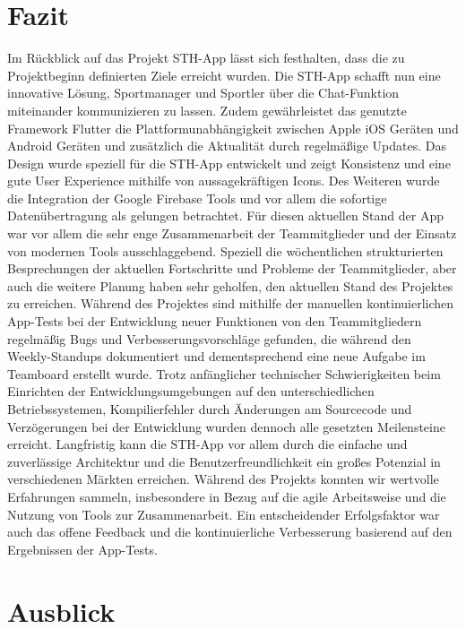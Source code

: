 \chapter{Fazit}
Im Rückblick auf das Projekt STH-App lässt sich festhalten, dass die zu Projektbeginn definierten Ziele erreicht wurden.
Die STH-App schafft nun eine innovative Lösung, Sportmanager und Sportler über die Chat-Funktion miteinander kommunizieren zu lassen.
Zudem gewährleistet das genutzte Framework Flutter die Plattformunabhängigkeit zwischen Apple iOS Geräten und Android Geräten und zusätzlich die Aktualität durch regelmäßige Updates.
Das Design wurde speziell für die STH-App entwickelt und zeigt Konsistenz und eine gute User Experience mithilfe von aussagekräftigen Icons.
Des Weiteren wurde die Integration der Google Firebase Tools und vor allem die sofortige Datenübertragung als gelungen betrachtet.\newline
Für diesen aktuellen Stand der App war vor allem die sehr enge Zusammenarbeit der Teammitglieder und der Einsatz von modernen Tools ausschlaggebend.
Speziell die wöchentlichen strukturierten Besprechungen der aktuellen Fortschritte und Probleme der Teammitglieder, aber auch die weitere Planung haben sehr geholfen, den aktuellen Stand des Projektes zu erreichen.
Während des Projektes sind mithilfe der manuellen kontinuierlichen App-Tests bei der Entwicklung neuer Funktionen von den Teammitgliedern regelmäßig Bugs und Verbesserungsvorschläge gefunden, die während den Weekly-Standups dokumentiert und dementsprechend eine neue Aufgabe im Teamboard erstellt wurde.\newline
Trotz anfänglicher technischer Schwierigkeiten beim Einrichten der Entwicklungsumgebungen auf den unterschiedlichen Betriebssystemen, Kompilierfehler durch Änderungen am Sourcecode und Verzögerungen bei der Entwicklung wurden dennoch alle gesetzten Meilensteine erreicht.
Langfristig kann die STH-App vor allem durch die einfache und zuverlässige Architektur und die Benutzerfreundlichkeit ein großes Potenzial in verschiedenen Märkten erreichen.\newline
Während des Projekts konnten wir wertvolle Erfahrungen sammeln, insbesondere in Bezug auf die agile Arbeitsweise und die Nutzung von Tools zur Zusammenarbeit.
Ein entscheidender Erfolgsfaktor war auch das offene Feedback und die kontinuierliche Verbesserung basierend auf den Ergebnissen der App-Tests.

\chapter{Ausblick}

